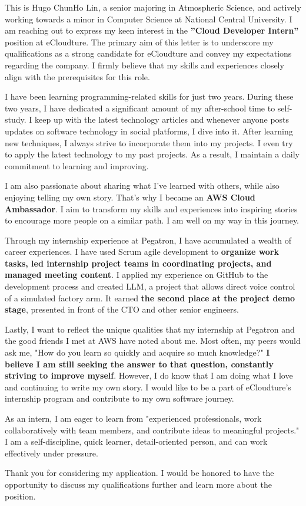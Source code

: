 
This is Hugo ChunHo Lin, a senior majoring in Atmospheric Science, and actively working towards a minor in Computer Science at National Central University. I am reaching out to express my keen interest in the \textbf{”Cloud Developer Intern”} position at eCloudture. The primary aim of this letter is to underscore my qualifications as a strong candidate for eCloudture and convey my expectations regarding the company. I firmly believe that my skills and experiences closely align with the prerequisites for this role.

I have been learning programming-related skills for just two years. During these two years, I have dedicated a significant amount of my after-school time to self-study. I keep up with the latest technology articles and whenever anyone posts updates on software technology in social platforms, I dive into it. After learning new techniques, I always strive to incorporate them into my projects. I even try to apply the latest technology to my past projects. As a result, I maintain a daily commitment to learning and improving.

I am also passionate about sharing what I've learned with others, while also enjoying telling my own story. That's why I became an \textbf{AWS Cloud Ambassador}. I aim to transform my skills and experiences into inspiring stories to encourage more people on a similar path. I am well on my way in this journey.

Through my internship experience at Pegatron, I have accumulated a wealth of career experiences. I have used Scrum agile development to \textbf{organize work tasks, led internship project teams in coordinating projects, and managed meeting content}. I applied my experience on GitHub to the development process and created LLM, a project that allows direct voice control of a simulated factory arm. It earned \textbf{the second place at the project demo stage}, presented in front of the CTO and other senior engineers.

Lastly, I want to reflect the unique qualities that my internship at Pegatron and the good friends I met at AWS have noted about me. Most often, my peers would ask me, "How do you learn so quickly and acquire so much knowledge?" \textbf{I believe I am still seeking the answer to that question, constantly striving to improve myself}. However, I do know that I am doing what I love and continuing to write my own story. I would like to be a part of eCloudture's internship program and contribute to my own software journey.

As an intern, I am eager to learn from "experienced professionals, work collaboratively with team members, and contribute ideas to meaningful projects." I am a self-discipline, quick learner, detail-oriented person, and can work effectively under pressure.

Thank you for considering my application. I would be honored to have the opportunity to discuss my qualifications further and learn more about the position.
